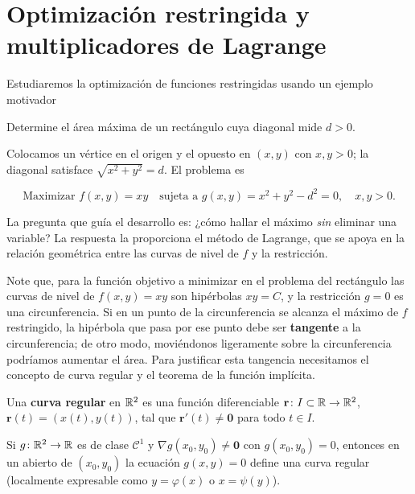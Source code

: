 \section{Optimización restringida y multiplicadores de Lagrange}

Estudiaremos la optimización de funciones restringidas usando un ejemplo motivador

\begin{prob}
Determine el área máxima de un rectángulo cuya diagonal mide $d>0$.
\end{prob}

Colocamos un vértice en el origen y el opuesto en $(x,y)$ con $x,y>0$; la diagonal satisface $\sqrt{x^2+y^2}=d$. El problema es

\[
\text{Maximizar } f(x,y)=xy \quad \text{sujeta a } g(x,y)=x^2+y^2-d^2=0,\quad x,y>0.
\]

La pregunta que guía el desarrollo es: ¿cómo hallar el máximo \emph{sin} eliminar una variable? La respuesta la proporciona el método de Lagrange, que se apoya en la relación geométrica entre las curvas de nivel de $f$ y la restricción.



Note que, para la función objetivo a minimizar en el problema del rectángulo las curvas de nivel de $f(x,y)=xy$ son hipérbolas $xy=C$, y la restricción $g=0$ es una circunferencia. Si en un punto de la circunferencia se alcanza el máximo de $f$ restringido, la hipérbola que pasa por ese punto debe ser \textbf{tangente} a la circunferencia; de otro modo, moviéndonos ligeramente sobre la circunferencia podríamos aumentar el área. Para justificar esta tangencia necesitamos el concepto de curva regular y el teorema de la función implícita.

\begin{definition}
Una \textbf{curva regular} en ${\mathbb R}^2$ es una función diferenciable $\mathbf{r}\colon I\subset{\mathbb R}\to{\mathbb R}^2$, $\mathbf{r}(t)=(x(t),y(t))$, tal que $\mathbf{r}'(t)\neq\mathbf{0}$ para todo $t\in I$.
\end{definition}

\begin{theorem}
Si $g\colon{\mathbb R}^2\to{\mathbb R}$ es de clase $\mathcal C^1$ y $\nabla g(x_0,y_0)\neq\mathbf{0}$ con $g(x_0,y_0)=0$, entonces en un abierto de $(x_0,y_0)$ la ecuación $g(x,y)=0$ define una curva regular (localmente expresable como $y=\varphi(x)$ o $x=\psi(y)$).
\end{theorem}

